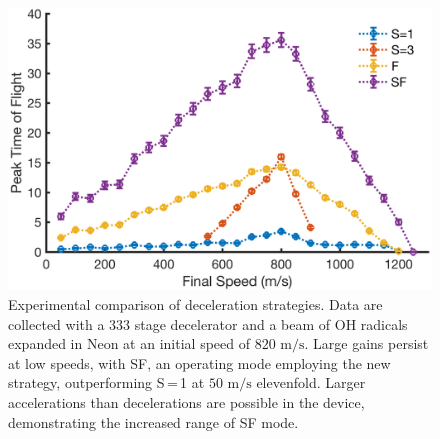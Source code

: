 \documentclass[%
 reprint,
 amsmath,amssymb,
 aps,
prl,
]{revtex4-1}
\begin{document}
\begin{figure}[t]
\includegraphics[width=\linewidth]{Data/Data-Figure-Final-Speed.png}%
\caption{\label{fig:alldata}
Experimental comparison of deceleration strategies. 
Data are collected with a $333$ stage decelerator and a beam of OH radicals expanded in Neon at an initial speed of $820\text{ m/s}$. 
Large gains persist at low speeds, with SF, an operating mode employing the new strategy, outperforming S\,=\,1 at $50\text{ m/s}$ elevenfold.
Larger accelerations than decelerations are possible in the device, demonstrating the increased range of SF mode.\vspace{-4mm}
}
\end{figure}
\end{document}
